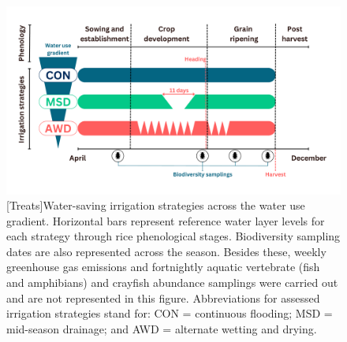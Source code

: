 \begin{figure} [ht]
\captionsetup{justification=justified}
	\centering 
	\includegraphics[scale=0.3, center]{Figures/Chapter_1/CERESTRES_Treatments.pdf}
	[Treats]{Water-saving irrigation strategies across the water use gradient. Horizontal bars represent reference water layer levels for each strategy through rice phenological stages. Biodiversity sampling dates are also represented across the season. Besides these, weekly greenhouse gas emissions and fortnightly aquatic vertebrate (fish and amphibians) and crayfish abundance samplings were carried out and are not represented in this figure. Abbreviations for assessed irrigation strategies stand for: CON = continuous flooding; MSD = mid-season drainage; and AWD = alternate wetting and drying.}   
	\label{Exp.des}
\end{figure}

